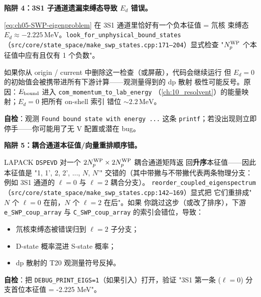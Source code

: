 \begin{pitfallbox}[label={box:ch05-pitfall-3S1-bound}]
\textbf{陷阱 4：3S1 子通道遗漏束缚态导致 \(E_d\) 错误。}

\cref{eq:ch05-SWP-eigenproblem} 在 3S1 通道里恰好有一个负本征值 = 氘核
束缚态 \(E_d \approx -2.225\,\mathrm{MeV}\)。\texttt{look\_for\_unphysical\_bound\_states}
（\texttt{src/core/state\_space/make\_swp\_states.cpp:171--204}）显式检查
"\({N_{p}^{\text{WP}}}\) 个本征值中应有且仅有 1 个负数"。

如果你从 origin / current 中删除这一检查（或屏蔽），代码会继续运行
但 \(E_d = 0\) 的初始值会被携带进所有下游计算——观测量得到的 dp 散射
极性可能反号。原因：\(E_{\rm bound}\) 进入 \texttt{com\_momentum\_to\_lab\_energy}
（\cref{ch:10_resolvent}）的能量映射；\(E_d = 0\) 把所有 on-shell 索引
错位 \(\sim 2.2\,\mathrm{MeV}\)。

\textbf{自检}：观测 \texttt{Found bound state with energy ...} 这条
\texttt{printf}；若没出现则立即停手——你可能用了无 V 配置或潜在 bug。
\end{pitfallbox}

\begin{pitfallbox}[label={box:ch05-pitfall-coupled-reorder}]
\textbf{陷阱 5：耦合通道本征值/向量重排顺序错。}

LAPACK \texttt{DSPEVD} 对一个 \(2{N_{p}^{\text{WP}}} \times 2{N_{p}^{\text{WP}}}\) 耦合通道矩阵返
回\textbf{升序}本征值——因此本征值是 "1, 1', 2, 2', ..., \(N\), \(N\)'"
交错的（其中带撇与不带撇代表两条物理分支：例如 3S1 通道的 \(\ell = 0\)
与 \(\ell = 2\) 耦合分支）。
\texttt{reorder\_coupled\_eigenspectrum}
（\texttt{src/core/state\_space/make\_swp\_states.cpp:142--169}）显式把
它们重排成"\(N\) 个 \(\ell=0\) 在前，\(N\) 个 \(\ell=2\) 在后"。如果
你跳过这步（或改了排序），下游 \texttt{e\_SWP\_coup\_array} 与
\texttt{C\_SWP\_coup\_array} 的索引会错位，导致：
\begin{itemize}
  \item 氘核束缚态被错误归到 \(\ell = 2\) 子分支；
  \item D-state 概率混进 S-state 概率；
  \item dp 散射的 T20 观测量符号反掉。
\end{itemize}
\textbf{自检}：把 \texttt{DEBUG\_PRINT\_EIGS=1}（如果引入）打开，验证
"3S1 第一条 ($\ell=0$) 分支首位本征值 = -2.225 MeV"。
\end{pitfallbox}

